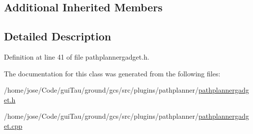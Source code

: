 \subsection*{Additional Inherited Members}


\subsection{Detailed Description}


Definition at line 41 of file pathplannergadget.\-h.



The documentation for this class was generated from the following files\-:\begin{DoxyCompactItemize}
\item 
/home/jose/\-Code/gui\-Tau/ground/gcs/src/plugins/pathplanner/\hyperlink{pathplannergadget_8h}{pathplannergadget.\-h}\item 
/home/jose/\-Code/gui\-Tau/ground/gcs/src/plugins/pathplanner/\hyperlink{pathplannergadget_8cpp}{pathplannergadget.\-cpp}\end{DoxyCompactItemize}
